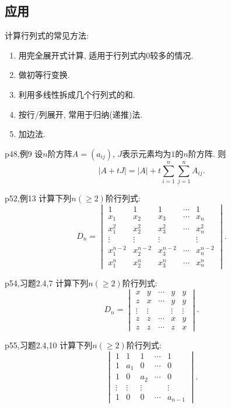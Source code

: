\subsection*{应用}

计算行列式的常见方法: 

\begin{enumerate}
	\item 用完全展开式计算, 适用于行列式内$0$较多的情况. 
	\item 做初等行变换. 
	\item 利用多线性拆成几个行列式的和. 
	\item 按行/列展开, 常用于归纳(递推)法. 
	\item 加边法. 
\end{enumerate}

\begin{example}{p48,例9}
	设$n$阶方阵$A=(a_{ij})$, $J$表示元素均为$1$的$n$阶方阵. 则$$|A+tJ| = |A|+t\sum_{i=1}^{n}\sum_{j=1}^{n} A_{ij}.$$
\end{example}

\begin{example}{p52,例13}
	计算下列$n (\geq 2)$阶行列式: $$D_n = \begin{vmatrix}
 1 & 1 & 1 & \cdots & 1\\
 x_1 & x_2 & x_3 & \cdots & x_n\\
 x_1^2 & x_2^2 & x_3^2 & \cdots & x_n^2\\
 \vdots & \vdots & \vdots &  & \vdots \\
 x_1^{n-2} & x_2^{n-2} & x_3^{n-2} & \cdots & x_n^{n-2} \\
 x_1^{n} & x_2^{n} & x_3^{n} & \cdots & x_n^{n}
\end{vmatrix}.$$
\end{example}

\begin{example}{p54,习题2.4,7}
	计算下列$n (\geq 2)$阶行列式: $$D_n = \begin{vmatrix}
 x & y & \cdots & y & y\\
 z & x & \cdots & y &y \\
 \vdots & \vdots &  &\vdots  &\vdots \\
  z& z & \cdots & x & y\\
 z &z  & \cdots & z &x
\end{vmatrix}.$$
\end{example}

\begin{example}{p55,习题2.4,10}
	计算下列$n (\geq 2)$阶行列式: $$\begin{vmatrix}
 1 & 1 & 1 & \cdots & 1\\
 1 & a_1 & 0 & \cdots &0 \\
 1 & 0 & a_2  & \cdots & 0 \\
 \vdots & \vdots & \vdots &  & \vdots\\
 1 & 0  & 0 & \cdots & a_{n-1}
\end{vmatrix}.$$
\end{example}

